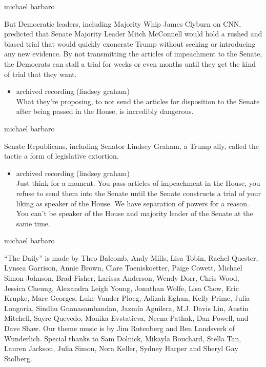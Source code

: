 michael barbaro

But Democratic leaders, including Majority Whip James Clyburn on CNN,
predicted that Senate Majority Leader Mitch McConnell would hold a
rushed and biased trial that would quickly exonerate Trump without
seeking or introducing any new evidence. By not transmitting the
articles of impeachment to the Senate, the Democrats can stall a trial
for weeks or even months until they get the kind of trial that they
want.

\begin{itemize}
\tightlist
\item
  archived recording (lindsey graham)\\
  What they're proposing, to not send the articles for disposition to
  the Senate after being passed in the House, is incredibly dangerous.
\end{itemize}

michael barbaro

Senate Republicans, including Senator Lindsey Graham, a Trump ally,
called the tactic a form of legislative extortion.

\begin{itemize}
\tightlist
\item
  archived recording (lindsey graham)\\
  Just think for a moment. You pass articles of impeachment in the
  House, you refuse to send them into the Senate until the Senate
  constructs a trial of your liking as speaker of the House. We have
  separation of powers for a reason. You can't be speaker of the House
  and majority leader of the Senate at the same time.
\end{itemize}

michael barbaro

``The Daily'' is made by Theo Balcomb, Andy Mills, Lisa Tobin, Rachel
Quester, Lynsea Garrison, Annie Brown, Clare Toeniskoetter, Paige
Cowett, Michael Simon Johnson, Brad Fisher, Larissa Anderson, Wendy
Dorr, Chris Wood, Jessica Cheung, Alexandra Leigh Young, Jonathan Wolfe,
Lisa Chow, Eric Krupke, Marc Georges, Luke Vander Ploeg, Adizah Eghan,
Kelly Prime, Julia Longoria, Sindhu Gnanasambandan, Jazmín Aguilera,
M.J. Davis Lin, Austin Mitchell, Sayre Quevedo, Monika Evstatieva, Neena
Pathak, Dan Powell, and Dave Shaw. Our theme music is by Jim Rutenberg
and Ben Landsverk of Wunderlich. Special thanks to Sam Dolnick, Mikayla
Bouchard, Stella Tan, Lauren Jackson, Julia Simon, Nora Keller, Sydney
Harper and Sheryl Gay Stolberg.

